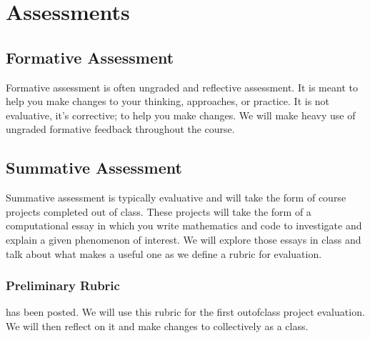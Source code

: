 \documentclass[letterpaper,10pt,english]{jupyterBook}
\begin{document}
\sphinxstepscope


\section{Assessments}
\label{\detokenize{content/0_course/assessments:assessments}}\label{\detokenize{content/0_course/assessments::doc}}

\subsection{Formative Assessment}
\label{\detokenize{content/0_course/assessments:formative-assessment}}
\sphinxAtStartPar
Formative assessment is often ungraded and reflective assessment. It is meant to help you make changes to your thinking, approaches, or practice. It is not evaluative, it’s corrective; to help you make changes. We will make heavy use of ungraded formative feedback throughout the course.


\subsection{Summative Assessment}
\label{\detokenize{content/0_course/assessments:summative-assessment}}
\sphinxAtStartPar
Summative assessment is typically evaluative and will take the form of course projects completed out of class. These projects will take the form of a computational essay in which you write mathematics and code to investigate and explain a given phenomenon of interest. We will explore those essays in class and talk about what makes a useful one as we define a rubric for evaluation.


\subsubsection{Preliminary Rubric}
\label{\detokenize{content/0_course/assessments:preliminary-rubric}}
\sphinxAtStartPar
{\hyperref[\detokenize{content/0_course/rubric::doc}]{}} has been posted. We will use this rubric for the first out\sphinxhyphen{}of\sphinxhyphen{}class project evaluation. We will then reflect on it and make changes to collectively as a class.
\end{document}
